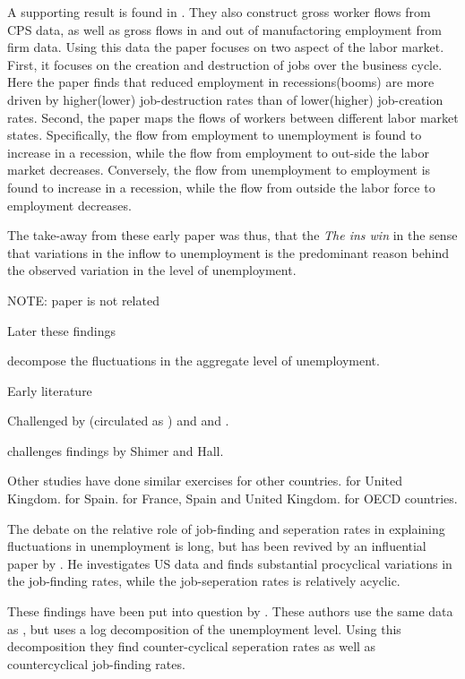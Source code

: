 A supporting result is found in \cite{Blanchard1990}. They also construct gross worker flows from CPS data, as well as gross flows in and out of manufactoring employment from firm data. Using this data the paper focuses on two aspect of the labor market. First, it focuses on the creation and destruction of jobs over the business cycle. Here the paper finds that reduced employment in recessions(booms) are more driven by higher(lower) job-destruction rates than of lower(higher) job-creation rates. Second, the paper maps the flows of workers between different labor market states. Specifically, the flow
from employment to unemployment is found to increase in a recession, while the flow from employment to out-side the labor market decreases. Conversely, the flow from unemployment to employment is found to increase in a recession, while the flow from outside the labor force to employment decreases. 

The take-away from these early paper was thus, that the \emph{The ins win} in the sense that variations in the inflow to unemployment is the predominant reason behind the observed variation in the level of unemployment.

NOTE: \cite{Darby1985} paper is not related

Later these findings
  
decompose the fluctuations in the aggregate level of unemployment.  

Early literature \cite{Darby1986} \cite{Darby1986} \cite{Davis1992} \cite{Blanchard1990}

Challenged by \cite{Shimer2012} (circulated as \cite{Shimer2007}) and \cite{Hal2005a} and \cite{Hal2005b}.

\cite{Elsby2009} \cite{Fujita2009} \cite{Yashiv2007} challenges findings by Shimer and Hall. 

Other studies have done similar exercises for other countries. \cite{Gomes2012} for United Kingdom. \cite{Silva2013} for Spain. \cite{Petrongolo2008} for France, Spain and United Kingdom. \cite{Elsby2013} for OECD countries. 

The debate on the relative role of job-finding and seperation rates in explaining fluctuations in unemployment is long, but has been revived by an influential paper by \cite{Shimer}. He investigates US data and finds substantial procyclical variations in the job-finding rates, while the job-seperation rates is relatively acyclic. 

These findings have been put into question by \cite{Elsby et al}. These authors use the same data as \cite{Shimer}, but uses a log decomposition of the unemployment level. Using this decomposition they find counter-cyclical seperation rates as well as countercyclical job-finding rates. 